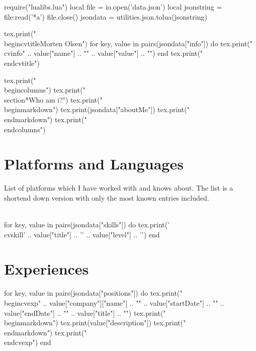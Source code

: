\begin{luacode}
require("lualibs.lua")
local file = io.open('data.json')
local jsonstring = file:read('*a')
file.close()
jsondata =  utilities.json.tolua(jsonstring)
\end{luacode}

\begin{luacode}
	tex.print("\\begin{cvtitle}{Morten Olsen}")
	for key, value in pairs(jsondata["info"]) do
		tex.print("\\cvinfo{" .. value["name"] .. "}{" .. value["value"] .. "}")
	end
	tex.print("\\end{cvtitle}")
\end{luacode}

\begin{luacode}
	tex.print("\\begin{columns}")
	tex.print("\\section*{Who am i?}")
	tex.print("\\begin{markdown}")
	tex.print(jsondata["aboutMe"])
	tex.print("\\end{markdown}")
	tex.print("\\end{columns}")
\end{luacode}

\section*{Platforms and Languages}
	List of platforms which I have worked with and knows about. The list is a shortend down version with only the most known entries included.\\\\

\begin{cvskills}
\begin{luacode}
for key, value in pairs(jsondata["skills"]) do
	tex.print('\\cvskill{' .. value["title"] .. '}{' .. value["level"] .. '}')
end
\end{luacode}
\end{cvskills}

\section*{Experiences}

\begin{luacode}
for key, value in pairs(jsondata["positions"]) do
	tex.print("\\begin{cvexp}{" .. value["company"]["name"] .. "}{" .. value["startDate"] .. "}{" .. value["endDate"] .. "}{" .. value["title"] .. "}")
	tex.print("\\begin{markdown}")
	tex.print(value["description"])
	tex.print("\\end{markdown}")
	tex.print("\\end{cvexp}")
end
\end{luacode}

